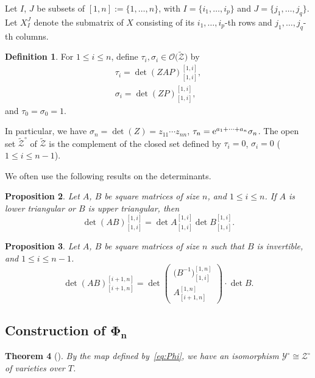 \documentclass[pdftex]{sigma}
\numberwithin{equation}{section}
\renewcommand{\O}{\mathscr{O}}
\newtheorem{Theorem}{Theorem}[section]
\newtheorem{Proposition}[Theorem]{Proposition}
\theoremstyle{definition}
\newtheorem{Definition}[Theorem]{Definition}
\begin{document}
Let $I$, $J$ be subsets of $[1,n]:=\{1,\dots,n\}$,
with $I=\{i_1,\dots,i_p\}$ and $J=\{j_1,\dots,j_q\}$.
Let
$X^{J}_{I}$ denote the submatrix of $X$ consisting of its $i_1,\dots,i_p$-th rows and $j_1,\dots,j_q$-th columns.
\begin{Definition}
For $1\le i\le n$, define $\tau_i, \sigma_i\in \O\bigl(\tilde{\mathscr{Z}}\bigr)$ by
\begin{gather}\label{eq:def_of_tau}
\tau_i=
\det(ZAP)^{[1,i]}_{[1,i]},\\
\label{eq:def_of_sigma_i}
\sigma_i
=
\det(ZP)^{[1,i]}_{[1,i]},
\end{gather}
and $\tau_0=\sigma_0=1$.
\end{Definition}
In particular, we have
$
\sigma_n=\det(Z)=z_{11}\cdots z_{nn}$, $
\tau_n={\rm e}^{a_1+\dots+a_n}\sigma_n$.
The open set $\tilde{\mathscr{Z}}^\circ$
of $\tilde{\mathscr{Z}}$ is
the complement of the closed set defined by
$\tau_i= 0$, $\sigma_i=0$ ($1\le i\le n-1$).




We often use the following results on
the determinants.
\begin{Proposition}\label{prop:Noumi}
Let $A$, $B$ be square matrices of size $n$, and $1\le i\le n$.
If $A$ is lower triangular or $B$ is upper triangular, then
\[
\det(AB)^{[1,i]}_{[1,i]}=\det A^{[1,i]}_{[1,i]}
\det B^{[1,i]}_{[1,i]}.
\]
\end{Proposition}


\begin{Proposition}\label{prop:det AB partial}
Let $A$, $B$ be square matrices of size $n$ such that $B$ is invertible, and $1\le i\le n-1$.
\[
\det(AB)^{[i+1,n]}_{[i+1,n]}
=\det\left(
\begin{matrix}
\bigl(B^{-1}\bigr)^{[1,n]}_{[1,i]}\\\hline
A^{[1,n]}_{[i+1,n]}
\end{matrix}
\right)\cdot \det B.
\]
\end{Proposition}


\subsection[Construction of Phi\_n]{Construction of $\boldsymbol{\Phi_n}$}
\begin{Theorem}[{\cite[Section~3]{IIM}}]By the map defined by~\eqref{eq:Phi}, we have
an isomorphism
$\mathscr{Y}^\circ\cong \mathscr{Z}^\circ$
of varieties over $T$.
\end{Theorem}
\end{document}
